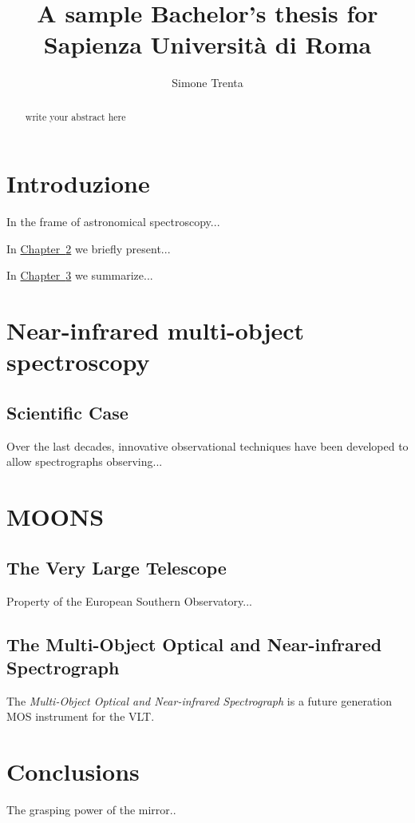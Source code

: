 \documentclass[Lau, oneside]{sapthesis}%
\title{A sample Bachelor's thesis for Sapienza Università di Roma}
\author{Simone Trenta}
\begin{document}
\frontmatter
\maketitle

\begin{abstract}
write your abstract here
\end{abstract}

\tableofcontents

\mainmatter
\chapter{Introduzione}
\lettrine[lines=2, findent=3pt, nindent=0pt]{I}{}n the frame of astronomical spectroscopy...

\bigskip
In \hyperref[chap:1]{Chapter~\ref*{chap:1}} we  briefly present...

\bigskip
In \hyperref[chap:2]{Chapter~\ref*{chap:2}} we summarize...

\chapter{Near-infrared multi-object spectroscopy}
\label{chap:1} 
\section{Scientific Case}
\label{sec:caso}
Over the last decades, innovative observational techniques have been developed to allow spectrographs observing...

\chapter{MOONS}
\label{chap:2}
\section{The Very Large Telescope}
Property of the European Southern Observatory...

\section{The Multi-Object Optical and Near-infrared Spectrograph}
\label{sec:moons}

The \textit{Multi-Object Optical and Near-infrared Spectrograph} is a future generation MOS instrument for the VLT. 

\chapter{Conclusions}
The grasping power of the mirror..
\end{document}
